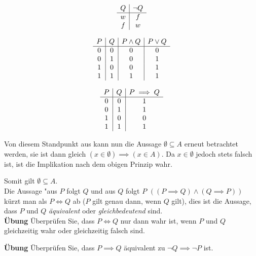 \documentclass{article}
\begin{document}
\begin{displaymath}
  \begin{array}{c | c }  
    Q & \neg Q \\
    \hline
    w & f \\
    f & w \\
  \end{array}
\end{displaymath}

\begin{displaymath}
  \begin{array}{ c | c | c | c }
    P & Q & P \land Q & P \lor Q \\
    \hline
    0 & 0 & 0 & 0 \\
    0 & 1 & 0 & 1 \\
    1 & 0 & 0 & 1 \\
    1 & 1 & 1 & 1 \\
  \end{array}
\end{displaymath}

\begin{displaymath}
  \begin{array}{ c | c | c }
    P & Q & P \implies Q \\
    \hline
    0 & 0 & 1 \\
    0 & 1 & 1 \\
    1 & 0 & 0 \\
    1 & 1 & 1 \\
  \end{array}
\end{displaymath}

Von diesem Standpunkt aus kann nun die Aussage $\emptyset \subseteq A$ erneut betrachtet werden,
sie ist dann gleich $(x \in \emptyset) \implies (x \in A)$.
Da $x \in \emptyset$ jedoch stets falsch ist, ist die Implikation nach dem obigen Prinzip wahr.

Somit gilt $\emptyset \subseteq A$. \\

Die Aussage "aus $P$ folgt $Q$ und aus $Q$ folgt $P$ $((P \implies Q) \land (Q \implies P))$ kürzt man
als $P \iff Q$ ab ($P$ gilt genau dann, wenn $Q$ gilt), dies ist die Aussage, dass $P$ und $Q$ \emph{äquivalent}
oder \emph{gleichbedeutend} sind. \\

\textbf{Übung} Überprüfen Sie, dass $P \iff Q$ nur dann wahr ist, wenn $P$ und $Q$ gleichzeitig wahr oder
gleichzeitig falsch sind.

\textbf{Übung} Überprüfen Sie, dass $P \implies Q$ äquivalent zu $\neg Q \implies \neg P$ ist.
\end{document}
